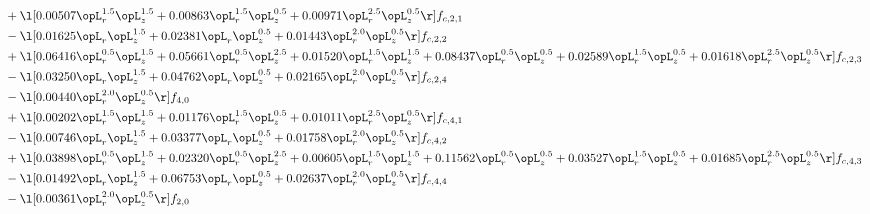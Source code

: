 \begin{alignat}{2}
& + \l[  0.00507 \opL_r^{1.5} \opL_z^{1.5} +  0.00863 \opL_r^{1.5} \opL_z^{0.5} +  0.00971 \opL_r^{2.5} \opL_z^{0.5}  \r] f_{c,2,1} \nonumber \\ 
& - \l[  0.01625 \opL_r \opL_z^{1.5} +  0.02381 \opL_r \opL_z^{0.5} +  0.01443 \opL_r^{2.0} \opL_z^{0.5}  \r] f_{c,2,2} \nonumber \\ 
& + \l[  0.06416 \opL_r^{0.5} \opL_z^{1.5} +  0.05661 \opL_r^{0.5} \opL_z^{2.5} +  0.01520 \opL_r^{1.5} \opL_z^{1.5} +  0.08437 \opL_r^{0.5} \opL_z^{0.5} +  0.02589 \opL_r^{1.5} \opL_z^{0.5} +  0.01618 \opL_r^{2.5} \opL_z^{0.5}  \r] f_{c,2,3} \nonumber \\ 
& - \l[  0.03250 \opL_r \opL_z^{1.5} +  0.04762 \opL_r \opL_z^{0.5} +  0.02165 \opL_r^{2.0} \opL_z^{0.5}  \r] f_{c,2,4} \nonumber \\ 
& - \l[  0.00440 \opL_r^{2.0} \opL_z^{0.5}  \r] f_{4,0} \nonumber \\ 
& + \l[  0.00202 \opL_r^{1.5} \opL_z^{1.5} +  0.01176 \opL_r^{1.5} \opL_z^{0.5} +  0.01011 \opL_r^{2.5} \opL_z^{0.5}  \r] f_{c,4,1} \nonumber \\ 
& - \l[  0.00746 \opL_r \opL_z^{1.5} +  0.03377 \opL_r \opL_z^{0.5} +  0.01758 \opL_r^{2.0} \opL_z^{0.5}  \r] f_{c,4,2} \nonumber \\ 
& + \l[  0.03898 \opL_r^{0.5} \opL_z^{1.5} +  0.02320 \opL_r^{0.5} \opL_z^{2.5} +  0.00605 \opL_r^{1.5} \opL_z^{1.5} +  0.11562 \opL_r^{0.5} \opL_z^{0.5} +  0.03527 \opL_r^{1.5} \opL_z^{0.5} +  0.01685 \opL_r^{2.5} \opL_z^{0.5}  \r] f_{c,4,3} \nonumber \\ 
& - \l[  0.01492 \opL_r \opL_z^{1.5} +  0.06753 \opL_r \opL_z^{0.5} +  0.02637 \opL_r^{2.0} \opL_z^{0.5}  \r] f_{c,4,4} \nonumber \\ 
& - \l[  0.00361 \opL_r^{2.0} \opL_z^{0.5}  \r] f_{2,0} \nonumber \\ 
\end{alignat} 


